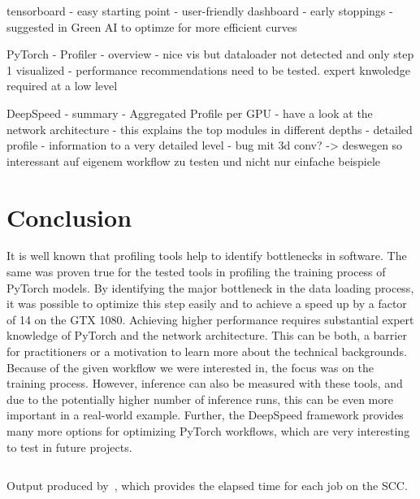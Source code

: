 \documentclass[12pt, a4paper, hidelinks]{article}
\begin{document}
tensorboard
    - easy starting point
    - user-friendly dashboard
    - early stoppings
    - suggested in Green AI to optimze for more efficient curves

PyTorch - Profiler
- overview
    - nice vis but dataloader not detected and only step 1 visualized
    - performance recommendations need to be tested. expert knwoledge required at a low level

DeepSpeed
    - summary
    - Aggregated Profile per GPU
        - have a look at the network architecture
        - this explains the top modules in different depths
    - detailed profile
        - information to a very detailed level
    - bug mit 3d conv? -> deswegen so interessant auf eigenem workflow zu testen und nicht nur einfache beispiele

\fi


\section{Conclusion}
\label{sec:conclusion}

It is well known that profiling tools help to identify bottlenecks in software. The same was proven true for the tested tools in profiling the training process of PyTorch models. By identifying the major bottleneck in the data loading process, it was possible to optimize this step easily and to achieve a speed up by a factor of 14 on the GTX 1080.
Achieving higher performance requires substantial expert knowledge of PyTorch and the network architecture. This can be both, a barrier for practitioners or a motivation to learn more about the technical backgrounds.
Because of the given workflow we were interested in, the focus was on the training process. However, inference can also be measured with these tools, and due to the potentially higher number of inference runs, this can be even more important in a real-world example.
Further, the DeepSpeed framework provides many more options for optimizing PyTorch workflows, which are very interesting to test in future projects.


\newpage
\printbibliography[heading=bibintoc]

\appendix
\break

\renewcommand*{\thepage}{A\arabic{page}}

\begin{listing}[H]
\inputminted[xleftmargin=1em,linenos]{python}{./assets/sacct.out}
\caption[Sacct output]{Output produced by~, which provides the elapsed time for each job on the \ac{SCC}.}
\label{lst:sacct_out}
\end{listing}
\end{document}
